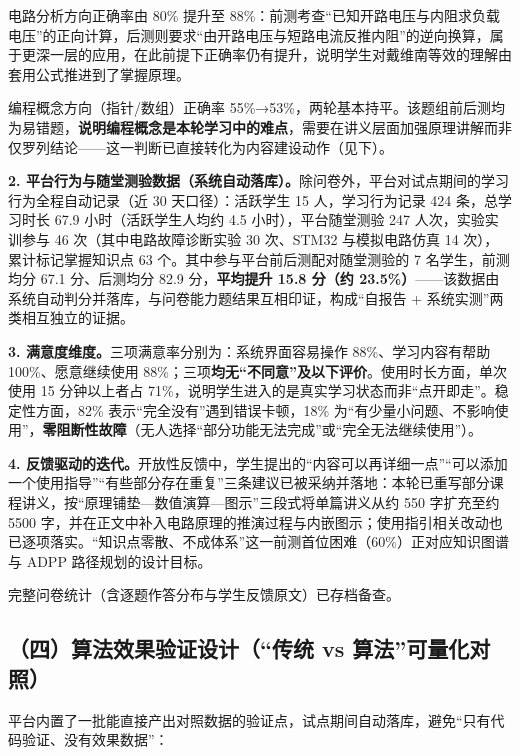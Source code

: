 \documentclass[zihao=-4,a4paper,UTF8,fontset=windows]{ctexart}
\begin{document}
电路分析方向正确率由 80\% 提升至 88\%：前测考查“已知开路电压与内阻求负载电压”的正向计算，后测则要求“由开路电压与短路电流反推内阻”的逆向换算，属于更深一层的应用，在此前提下正确率仍有提升，说明学生对戴维南等效的理解由套用公式推进到了掌握原理。

编程概念方向（指针/数组）正确率 55\%→53\%，两轮基本持平。该题组前后测均为易错题，\textbf{说明编程概念是本轮学习中的难点}，需要在讲义层面加强原理讲解而非仅罗列结论——这一判断已直接转化为内容建设动作（见下）。

\textbf{2. 平台行为与随堂测验数据（系统自动落库）。}除问卷外，平台对试点期间的学习行为全程自动记录（近 30 天口径）：活跃学生 15 人，学习行为记录 424 条，总学习时长 67.9 小时（活跃学生人均约 4.5 小时），平台随堂测验 247 人次，实验实训参与 46 次（其中电路故障诊断实验 30 次、STM32 与模拟电路仿真 14 次），累计标记掌握知识点 63 个。其中参与平台前后测配对随堂测验的 7 名学生，前测均分 67.1 分、后测均分 82.9 分，\textbf{平均提升 15.8 分（约 23.5\%）}——该数据由系统自动判分并落库，与问卷能力题结果互相印证，构成“自报告 + 系统实测”两类相互独立的证据。

\textbf{3. 满意度维度。}三项满意率分别为：系统界面容易操作 88\%、学习内容有帮助 100\%、愿意继续使用 88\%；三项\textbf{均无“不同意”及以下评价}。使用时长方面，单次使用 15 分钟以上者占 71\%，说明学生进入的是真实学习状态而非“点开即走”。稳定性方面，82\% 表示“完全没有”遇到错误卡顿，18\% 为“有少量小问题、不影响使用”，\textbf{零阻断性故障}（无人选择“部分功能无法完成”或“完全无法继续使用”）。

\textbf{4. 反馈驱动的迭代。}开放性反馈中，学生提出的“内容可以再详细一点”“可以添加一个使用指导”“有些部分存在重复”三条建议已被采纳并落地：本轮已重写部分课程讲义，按“原理铺垫—数值演算—图示”三段式将单篇讲义从约 550 字扩充至约 5500 字，并在正文中补入电路原理的推演过程与内嵌图示；使用指引相关改动也已逐项落实。“知识点零散、不成体系”这一前测首位困难（60\%）正对应知识图谱与 ADPP 路径规划的设计目标。

完整问卷统计（含逐题作答分布与学生反馈原文）已存档备查。

\subsection{（四）算法效果验证设计（“传统 vs 算法”可量化对照）}


平台内置了一批能直接产出对照数据的验证点，试点期间自动落库，避免“只有代码验证、没有效果数据”：
\end{document}
